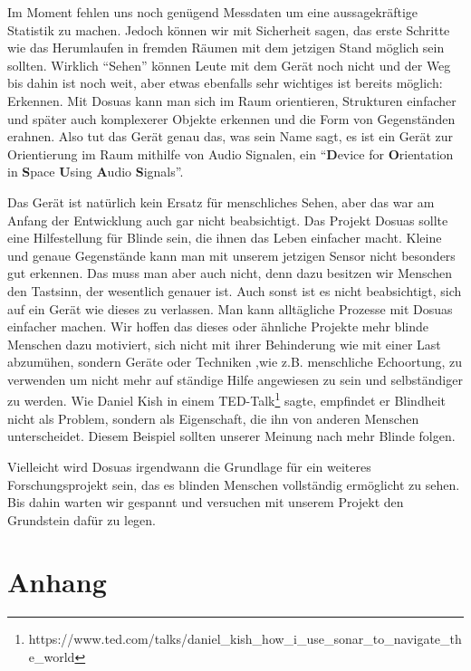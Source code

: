 \documentclass[a4paper,12pt,ngerman]{scrartcl}
\begin{document}
Im Moment fehlen uns noch genügend Messdaten um eine aussagekräftige Statistik zu machen. Jedoch
können wir mit Sicherheit sagen, das erste Schritte wie das Herumlaufen in fremden Räumen mit
dem jetzigen Stand möglich sein sollten. Wirklich \enquote{Sehen} können Leute mit dem Gerät
noch nicht und der Weg bis dahin ist noch weit, aber etwas ebenfalls sehr wichtiges
ist bereits möglich: Erkennen. Mit Dosuas kann man sich im Raum orientieren, Strukturen einfacher und später auch komplexerer Objekte erkennen und die Form von Gegenständen erahnen. Also tut das Gerät genau das, was sein Name sagt, es ist ein Gerät zur Orientierung im Raum mithilfe von Audio
Signalen, ein \enquote{\textbf{D}evice for \textbf{O}rientation in \textbf{S}pace \textbf{U}sing 
	\textbf{A}udio \textbf{S}ignals}.\par 
Das Gerät ist natürlich kein Ersatz für menschliches Sehen, aber das war am Anfang der Entwicklung
auch gar nicht beabsichtigt. Das Projekt Dosuas sollte eine Hilfestellung für Blinde sein, die ihnen das Leben einfacher macht. Kleine und genaue Gegenstände kann man mit unserem jetzigen Sensor nicht besonders gut erkennen. Das muss man aber auch nicht, denn dazu besitzen wir Menschen den Tastsinn, der wesentlich genauer ist. Auch sonst ist es nicht beabsichtigt, sich auf 
ein Gerät wie dieses zu verlassen. Man kann alltägliche Prozesse mit Dosuas einfacher machen. 
Wir hoffen das dieses oder ähnliche Projekte mehr blinde Menschen dazu motiviert, sich nicht 
mit ihrer Behinderung wie mit einer Last abzumühen, sondern Geräte oder Techniken
,wie z.B. menschliche Echoortung, zu verwenden um nicht mehr auf ständige Hilfe angewiesen 
zu sein und selbständiger zu werden. Wie Daniel Kish in einem TED-Talk\footnote{https://www.ted.com/talks/daniel\_kish\_how\_i\_use\_sonar\_to\_navigate\_the\_world} sagte, 
empfindet er Blindheit nicht als Problem, sondern als Eigenschaft, die ihn von anderen Menschen
unterscheidet. Diesem Beispiel sollten unserer Meinung nach mehr Blinde folgen.\par 
Vielleicht wird Dosuas irgendwann die Grundlage für ein weiteres
Forschungsprojekt sein, das es blinden Menschen vollständig ermöglicht zu sehen. Bis dahin
warten wir gespannt und versuchen mit unserem Projekt den Grundstein dafür zu legen. 

\newpage

\section{Anhang}
\end{document}
